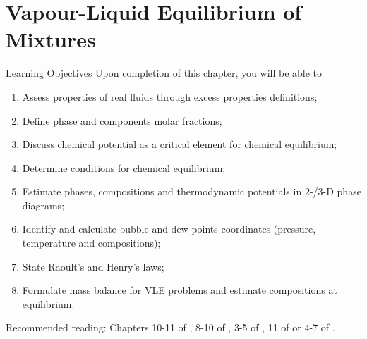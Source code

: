 \chapter{Vapour-Liquid Equilibrium of Mixtures}\label{Chapter:VLE}


   \begin{LearningObjectivesBlock}{Learning Objectives}
      Upon completion of this chapter, you will be able to
        \begin{enumerate}
           \item Assess properties of real fluids through excess properties definitions; 
           \item Define phase and components molar fractions;
           \item Discuss chemical potential as a critical element for chemical equilibrium;
           \item Determine conditions for chemical equilibrium;
           \item Estimate phases, compositions and thermodynamic potentials in 2-/3-D phase diagrams;
           \item Identify and calculate bubble and dew points coordinates (\ie pressure, temperature and compositions);
           \item State Raoult's and Henry's laws;
           \item Formulate mass balance for VLE problems and estimate compositions at equilibrium.
        \end{enumerate}
\medskip
     Recommended reading: Chapters 10-11 of \citet{SmithVanNess_Book}, 8-10 of \cite{Sandler_Book}, 3-5 of \citet{Lue_Book}, 11 of \citet{Moran_Book} or 4-7 of \citet{Atkins_Book}.
   \end{LearningObjectivesBlock}


\begin{comment}
   \begin{LearningObjectivesBlock}{Learning Objectives}
      Upon completion of this chapter, you will be able to
        \begin{enumerate}
           \item {\bf Knowledge:} Define, Name, Select, State 
           \item {\bf Comprehension:} Describe, Identify, Discuss
           \item {\bf Application:} Apply, Demonstrate, Employ, Sketch
           \item {\bf Analysis:} Analyse, Compare, Calculate, Solve
           \item {\bf Synthesis:} Determine, Formulate
           \item {\bf Evaluation:} Assess, Check, Estimate, Compare, Measure, Monitor
        \end{enumerate}
\end{comment}

